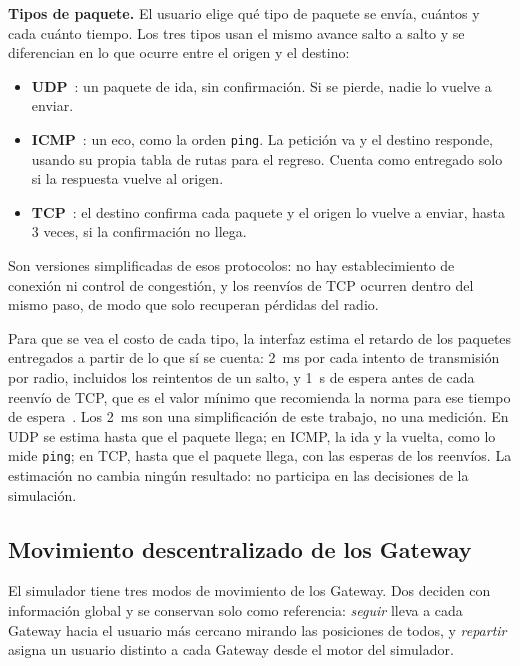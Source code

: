 \textbf{Tipos de paquete.} El usuario elige qué tipo de paquete se envía,
cuántos y cada cuánto tiempo. Los tres tipos usan el mismo avance salto a
salto y se diferencian en lo que ocurre entre el origen y el destino:

\begin{itemize}
\item \textbf{UDP}~\cite{Postel1980UDP}: un paquete de ida, sin confirmación. Si
se pierde, nadie lo vuelve a enviar.
\item \textbf{ICMP}~\cite{Postel1981ICMP}: un eco, como la orden \texttt{ping}.
La petición va y el destino responde, usando su propia tabla de rutas para el
regreso. Cuenta como entregado solo si la respuesta vuelve al origen.
\item \textbf{TCP}~\cite{Eddy2022TCP}: el destino confirma cada paquete y el
origen lo vuelve a enviar, hasta 3 veces, si la confirmación no llega.
\end{itemize}

Son versiones simplificadas de esos protocolos: no hay establecimiento de
conexión ni control de congestión, y los reenvíos de TCP ocurren dentro del
mismo paso, de modo que solo recuperan pérdidas del radio.

Para que se vea el costo de cada tipo, la interfaz estima el retardo de los
paquetes entregados a partir de lo que sí se cuenta: 2~ms por cada intento de
transmisión por radio, incluidos los reintentos de un salto, y 1~s de espera
antes de cada reenvío de TCP, que es el valor mínimo que recomienda la norma
para ese tiempo de espera~\cite{Paxson2011RTO}. Los 2~ms son una
simplificación de este trabajo, no una medición. En UDP se estima hasta que el
paquete llega; en ICMP, la ida y la vuelta, como lo mide \texttt{ping}; en
TCP, hasta que el paquete llega, con las esperas de los reenvíos. La
estimación no cambia ningún resultado: no participa en las decisiones de la
simulación.

\subsection{Movimiento descentralizado de los Gateway}
\label{sec:movilidad-descentralizada}

El simulador tiene tres modos de movimiento de los Gateway. Dos deciden con
información global y se conservan solo como referencia: \textit{seguir} lleva a
cada Gateway hacia el usuario más cercano mirando las posiciones de todos, y
\textit{repartir} asigna un usuario distinto a cada Gateway desde el motor del
simulador.

